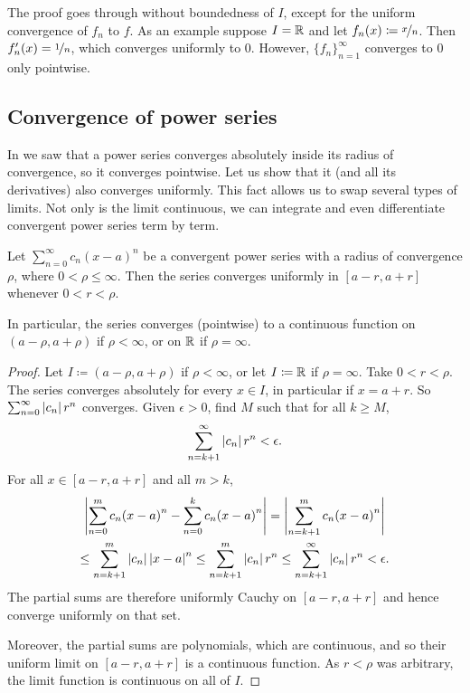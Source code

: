 The proof goes through without boundedness of $I$, except for the
uniform convergence of $f_n$ to $f$.  As an example suppose $I = {\mathbb{R}}$ and let
$f_n(x) \coloneqq \nicefrac{x}{n}$.  Then $f_n'(x)=\nicefrac{1}{n}$, which
converges uniformly to $0$.  However, $\{f_n\}_{n=1}^\infty$ converges to 0 only pointwise.

\subsection{Convergence of power series}

In  we saw that a power series converges
absolutely inside its radius of convergence, so it converges pointwise.
Let us show that it (and all its derivatives) also converges uniformly.
This fact allows us to
swap several types of limits.  Not only is the limit continuous,
we can
integrate and even differentiate convergent power series term by term.

\begin{prop}
Let $\sum_{n=0}^\infty c_n {(x-a)}^n$ be a convergent power series with a radius
of convergence $\rho$, where $0 < \rho \leq \infty$.
Then the series converges uniformly
in $[a-r,a+r]$ whenever $0 < r < \rho$.

In particular, the series converges (pointwise) to a continuous function
on $(a-\rho,a+\rho)$ if $\rho < \infty$, or on ${\mathbb{R}}$ if $\rho = \infty$.
\end{prop}

\begin{proof}
Let $I \coloneqq (a-\rho,a+\rho)$ if $\rho < \infty$,
or let $I \coloneqq {\mathbb{R}}$ if $\rho= \infty$.
Take $0 < r < \rho$.
The series converges absolutely for every $x \in I$,
in particular if $x = a+r$.
So $\sum_{n=0}^\infty \left\lvert {c_n} \right\rvert r^n$ converges.
Given $\epsilon >0$, find $M$ such that for all $k \geq M$,
\begin{equation*}
\sum_{n=k+1}^\infty \left\lvert {c_n} \right\rvert {r}^n < \epsilon .
\end{equation*}
For all $x \in [a-r,a+r]$ and all $m > k$,
\begin{multline*}
\left\lvert {\sum_{n=0}^m c_n {(x-a)}^n - 
\sum_{n=0}^k c_n {(x-a)}^n} \right\rvert
=
\left\lvert {\sum_{n=k+1}^m c_n {(x-a)}^n} \right\rvert
\\
\leq
\sum_{n=k+1}^m \left\lvert {c_n} \right\rvert {\left\lvert {x-a} \right\rvert}^n
\leq
\sum_{n=k+1}^m \left\lvert {c_n} \right\rvert {r}^n
\leq
\sum_{n=k+1}^\infty \left\lvert {c_n} \right\rvert {r}^n
<\epsilon.
\end{multline*}
The partial sums are therefore uniformly Cauchy on $[a-r,a+r]$ and
hence converge uniformly on that set.

Moreover, the partial sums are polynomials, which are
continuous, and so their uniform limit on $[a-r,a+r]$
is a continuous function.
As $r < \rho$ was arbitrary, the limit function
is continuous on all of $I$.
\end{proof}

